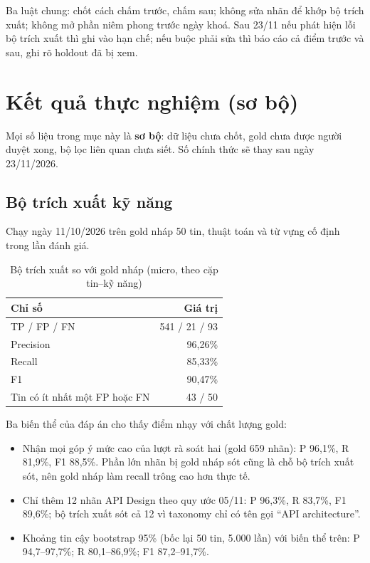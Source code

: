 \documentclass[12pt]{article}
\begin{document}
Ba luật chung: chốt cách chấm trước, chấm sau; không sửa nhãn để khớp bộ trích xuất; không mở phần niêm phong trước ngày khoá. Sau 23/11 nếu phát hiện lỗi bộ trích xuất thì ghi vào hạn chế; nếu buộc phải sửa thì báo cáo cả điểm trước và sau, ghi rõ holdout đã bị xem.

\newpage
\section{Kết quả thực nghiệm (sơ bộ)}
Mọi số liệu trong mục này là \textbf{sơ bộ}: dữ liệu chưa chốt, gold chưa được người duyệt xong, bộ lọc liên quan chưa siết. Số chính thức sẽ thay sau ngày 23/11/2026.

\subsection{Bộ trích xuất kỹ năng}
\label{sec:res-parser}

Chạy ngày 11/10/2026 trên gold nháp 50 tin, thuật toán và từ vựng cố định trong lần đánh giá.

\begin{table}[htbp]
\centering
\caption{Bộ trích xuất so với gold nháp (micro, theo cặp tin--kỹ năng)}
\label{tab:parser}
\renewcommand{\arraystretch}{1.15}
\begin{tabular}{l r}
\toprule
\textbf{Chỉ số} & \textbf{Giá trị} \\
\midrule
TP / FP / FN & 541 / 21 / 93 \\
Precision & 96,26\% \\
Recall & 85,33\% \\
F1 & 90,47\% \\
Tin có ít nhất một FP hoặc FN & 43 / 50 \\
\bottomrule
\end{tabular}
\end{table}

Ba biến thể của đáp án cho thấy điểm nhạy với chất lượng gold:
\begin{itemize}[noitemsep, topsep=2pt, leftmargin=2.5em]
\item Nhận mọi góp ý mức cao của lượt rà soát hai (gold 659 nhãn): P 96,1\%, R 81,9\%, F1 88,5\%. Phần lớn nhãn bị gold nháp sót cũng là chỗ bộ trích xuất sót, nên gold nháp làm recall trông cao hơn thực tế.
\item Chỉ thêm 12 nhãn API Design theo quy ước 05/11: P 96,3\%, R 83,7\%, F1 89,6\%; bộ trích xuất sót cả 12 vì taxonomy chỉ có tên gọi ``API architecture''.
\item Khoảng tin cậy bootstrap 95\% (bốc lại 50 tin, 5.000 lần) với biến thể trên: P 94,7--97,7\%; R 80,1--86,9\%; F1 87,2--91,7\%.
\end{itemize}
\end{document}
